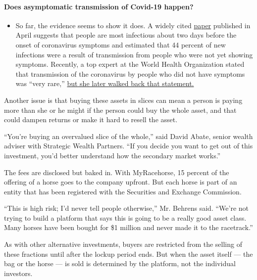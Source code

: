 \begin{itemize}
{  \paragraph{Does asymptomatic transmission of Covid-19
  happen?}\label{does-asymptomatic-transmission-of-covid-19-happen}}

  \begin{itemize}
  \tightlist
  \item
    So far, the evidence seems to show it does. A widely cited
    \href{https://www.nature.com/articles/s41591-020-0869-5}{paper}
    published in April suggests that people are most infectious about
    two days before the onset of coronavirus symptoms and estimated that
    44 percent of new infections were a result of transmission from
    people who were not yet showing symptoms. Recently, a top expert at
    the World Health Organization stated that transmission of the
    coronavirus by people who did not have symptoms was ``very rare,''
    \href{https://www.nytimes3xbfgragh.onion/2020/06/09/world/coronavirus-updates.html?action=click\&pgtype=Article\&state=default\&region=MAIN_CONTENT_3\&context=storylines_faq\#link-1f302e21}{but
    she later walked back that statement.}
  \end{itemize}
\end{itemize}

Another issue is that buying these assets in slices can mean a person is
paying more than she or he might if the person could buy the whole
asset, and that could dampen returns or make it hard to resell the
asset.

``You're buying an overvalued slice of the whole,'' said David Abate,
senior wealth adviser with Strategic Wealth Partners. ``If you decide
you want to get out of this investment, you'd better understand how the
secondary market works.''

The fees are disclosed but baked in. With MyRacehorse, 15 percent of the
offering of a horse goes to the company upfront. But each horse is part
of an entity that has been registered with the Securities and Exchange
Commission.

``This is high risk; I'd never tell people otherwise,'' Mr. Behrens
said. ``We're not trying to build a platform that says this is going to
be a really good asset class. Many horses have been bought for \$1
million and never made it to the racetrack.''

As with other alternative investments, buyers are restricted from the
selling of these fractions until after the lockup period ends. But when
the asset itself --- the bag or the horse --- is sold is determined by
the platform, not the individual investors.

